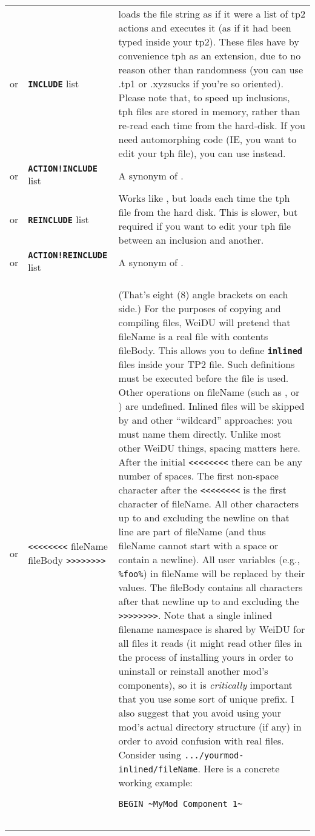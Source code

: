 \documentclass{article}
\def\ttref#1{\ahrefloc{#1}{\tt #1}}
\def\DEFINE#1{{\tt \bf #1}\label{#1}\index{#1}}
\def\t#1{{\tt #1}}
\def\Slist{{\color{red} list }}
\begin{document}
\begin{tabular}{cp{10in}|p{10in}}
or & \DEFINE{INCLUDE} \t{\ttref{String}} \Slist &
    loads the file string as if it were a list of tp2 actions and executes it (as if
		it had been typed inside your tp2).
    These files have by convenience tph as an extension, due to no reason other than
    randomness (you can use .tp1 or .xyzsucks if you're so oriented).
		Please note that, to speed up inclusions, tph files are stored in memory,
	  rather than re-read each time from the hard-disk. If you need automorphing code
		(IE, you want to edit your tph file), you can use \ttref{REINCLUDE} instead. \\
or & \DEFINE{ACTION!INCLUDE} \t{\ttref{String}} \Slist &
    A synonym of \ttref{INCLUDE}.
\\
or & \DEFINE{REINCLUDE} \t{\ttref{String}} \Slist &
    Works like \ttref{INCLUDE}, but loads each time the tph file from the hard disk.
    This is slower, but required if you want to edit your tph file between an
    inclusion and another.
    \\
or & \DEFINE{ACTION!REINCLUDE} \t{\ttref{String}} \Slist &
    A synonym of \ttref{REINCLUDE}.
    \\
  or & \t{<<<<<<<<} fileName fileBody \t{>>>>>>>>} &
    (That's eight (8) angle brackets on each side.)
    For the purposes of copying and compiling files, WeiDU will pretend
    that fileName is a real file with contents fileBody. This allows you to
    define \DEFINE{inlined} files inside your TP2 file. Such definitions
    must be executed before the \ttref{inlined} file is used. Other operations
    on fileName (such as \ttref{FILE!EXISTS}, \ttref{FILE!MD5} or
    \ttref{FILE!SIZE}) are undefined. Inlined files will be skipped by
    \ttref{COPY!EXISTING!REGEXP} and other ``wildcard'' approaches: you
    must name them directly. Unlike most other WeiDU things,
    spacing matters here. After the initial \t{<<<<<<<<} there can be
    any number of spaces. The first non-space character after the
    \t{<<<<<<<<} is the first character of fileName. All other
    characters up to and excluding the newline on that line are part of
    fileName (and thus fileName cannot start with a space or contain a
    newline). All user variables (e.g., \t{\%foo\%}) in fileName will be
    replaced by their values.
    The fileBody contains all characters after that newline up to
    and excluding the \t{>>>>>>>>}. Note that a single inlined filename
    namespace is shared by WeiDU for all \ttref{TP2} files it reads (it
    might read other \ttref{TP2} files in the process of installing yours
    in order to uninstall or reinstall another mod's components), so it is
    \emph{critically} important that you use some sort of unique prefix.
    I also suggest that you avoid using your mod's actual directory
    structure (if any) in order to avoid confusion with real files.
    Consider using \t{.../yourmod-inlined/fileName}.  Here is a concrete
    working example:
\begin{verbatim}
BEGIN ~MyMod Component 1~


\end{verbatim}
\end{tabular}
\end{document}
